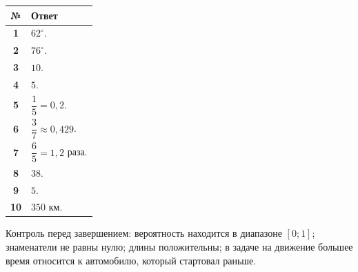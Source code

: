 \documentclass[a4paper,12pt]{article}
\begin{document}
\renewcommand{\arraystretch}{1.35}
\begin{tabularx}{\linewidth}{@{}>{\bfseries}c X@{}}
\toprule
№ & Ответ \\
\midrule
1 & \(62^\circ\). \\
2 & \(76^\circ\). \\
3 & \(10\). \\
4 & \(5\). \\
5 & \(\dfrac15=0{,}2\). \\
6 & \(\dfrac37\approx0{,}429\). \\
7 & \(\dfrac65=1{,}2\) раза. \\
8 & \(38\). \\
9 & \(5\). \\
10 & \(350\) км. \\
\bottomrule
\end{tabularx}

\vspace{10mm}

{\small\color{textgray}
Контроль перед завершением: вероятность находится в диапазоне \([0;1]\);
знаменатели не равны нулю; длины положительны; в задаче на движение большее время относится к автомобилю, который стартовал раньше.
}
\end{document}
